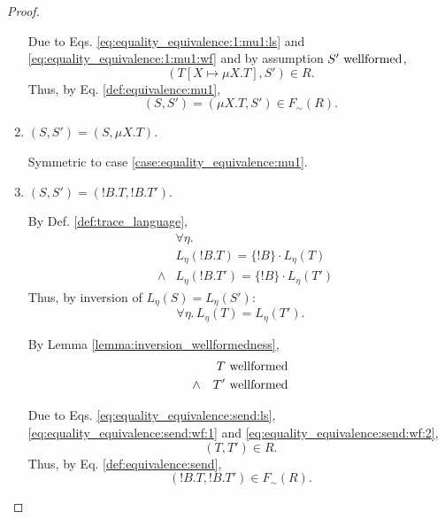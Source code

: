 \documentclass{llncs}
\newcommand*{\sequiv}{\sim}
\newcommand*{\send}{\mathord{!}}
\newcommand*{\concat}{\cdot}
\newcommand*{\wf}[1]{\text{$#1$ {\normalfont \rmfamily wellformed}}}
\renewcommand*{\|}{\;|\;}
\begin{document}
\begin{proof}
\begin{enumerate}
      Due to Eqs. \ref{eq:equality_equivalence:1:mu1:ls} and
      \ref{eq:equality_equivalence:1:mu1:wf} and by assumption
      $\wf{S'}$,
      \begin{equation*}
        (T[X \mapsto \mu X.T], S') \in R.
      \end{equation*}
      Thus, by Eq. \ref{def:equivalence:mu1},
      \begin{equation*}
        (S, S') = (\mu X.T, S') \in F_\sequiv(R).
      \end{equation*}

    \item
      \label{case:equality_equivalence:mu2}
      $(S, S') = (S, \mu X.T)$.

      Symmetric to case \ref{case:equality_equivalence:mu1}.

    \item
      \label{case:equality_equivalence:send}
      $(S, S') = (\send B.T, \send B.T')$.

      By Def. \ref{def:trace_language},
      \begin{eqnarray*}
        &&      \forall \eta. \\
        &&      L_\eta(\send B.T)  = \{\send B\} \concat L_\eta(T) \\
        &\land& L_\eta(\send B.T') = \{\send B\} \concat L_\eta(T')
      \end{eqnarray*}
      Thus, by inversion of $L_\eta(S) = L_\eta(S')$:
      \begin{equation}
        \label{eq:equality_equivalence:send:ls}
        \forall \eta.\, L_\eta(T) = L_\eta(T').
      \end{equation}

      By Lemma \ref{lemma:inversion_wellformedness},
      \begin{eqnarray}
        \label{eq:equality_equivalence:send:wf:1} &&      \wf{T} \\
        \label{eq:equality_equivalence:send:wf:2} &\land& \wf{T'}
      \end{eqnarray}

      Due to Eqs. \ref{eq:equality_equivalence:send:ls},
      \ref{eq:equality_equivalence:send:wf:1} and
      \ref{eq:equality_equivalence:send:wf:2},
      \begin{equation*}
        (T, T') \in R.
      \end{equation*}
      Thus, by Eq. \ref{def:equivalence:send},
      \begin{equation*}
        (\send B.T, \send B.T') \in F_\sequiv(R).
      \end{equation*}


\end{enumerate}
\end{proof}
\end{document}
